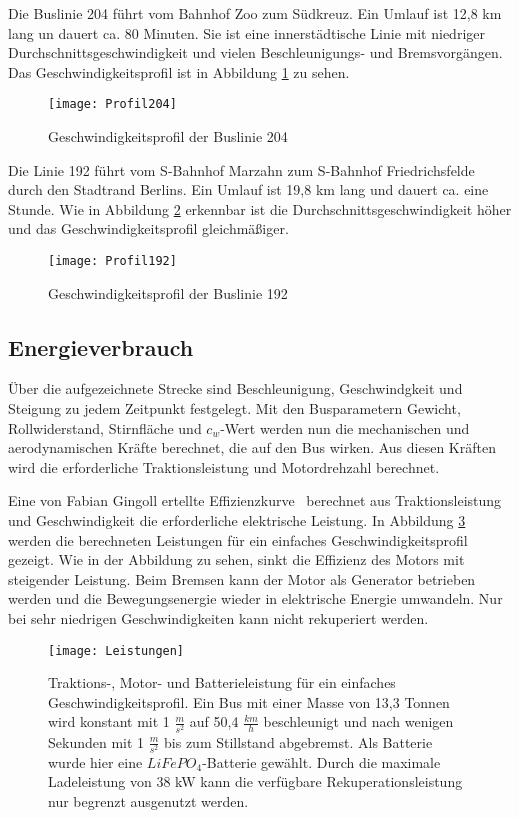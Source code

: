 Die Buslinie 204 führt vom Bahnhof Zoo zum Südkreuz. Ein Umlauf ist 12,8 km lang un dauert ca. 80 Minuten. Sie ist eine innerstädtische Linie mit niedriger Durchschnittsgeschwindigkeit und vielen Beschleunigungs- und Bremsvorgängen. Das Geschwindigkeitsprofil ist in Abbildung \ref{Abb_204} zu sehen.
\begin{figure}\centering
	\texttt{[image: Profil204]}
	\caption{Geschwindigkeitsprofil der Buslinie 204}
	\label{Abb_204}
\end{figure}

Die Linie 192 führt vom S-Bahnhof Marzahn zum S-Bahnhof Friedrichsfelde durch den Stadtrand Berlins. Ein Umlauf ist 19,8 km lang und dauert ca. eine Stunde. Wie in Abbildung \ref{Abb_192} erkennbar ist die Durchschnittsgeschwindigkeit höher und das Geschwindigkeitsprofil gleichmäßiger.

\begin{figure}\centering
	\texttt{[image: Profil192]}
	\caption{Geschwindigkeitsprofil der Buslinie 192}
	\label{Abb_192}
\end{figure}

\subsection{Energieverbrauch}
Über die aufgezeichnete Strecke sind Beschleunigung, Geschwindgkeit und Steigung zu jedem Zeitpunkt festgelegt. Mit den Busparametern Gewicht, Rollwiderstand, Stirnfläche und $c_w$-Wert werden nun die mechanischen und aerodynamischen Kräfte berechnet, die auf den Bus wirken. Aus diesen Kräften wird die erforderliche Traktionsleistung und Motordrehzahl berechnet.

Eine von Fabian Gingoll ertellte Effizienzkurve~\cite{MotorEntwurf} berechnet aus Traktionsleistung und Geschwindigkeit die erforderliche elektrische Leistung. In Abbildung \ref{abb_Leistungen} werden die berechneten Leistungen für ein einfaches Geschwindigkeitsprofil gezeigt. Wie in der Abbildung zu sehen, sinkt die Effizienz des Motors mit steigender Leistung. Beim Bremsen kann der Motor als Generator betrieben werden und die Bewegungsenergie wieder in elektrische Energie umwandeln. Nur bei sehr niedrigen Geschwindigkeiten kann nicht rekuperiert werden.
\begin{figure}\centering
	\texttt{[image: Leistungen]}
	\caption[Traktions-, Motor- und Batterieleistung]{Traktions-, Motor- und Batterieleistung für ein einfaches Geschwindigkeitsprofil. Ein Bus mit einer Masse von 13,3 Tonnen wird konstant mit 1 $\frac{m}{s^2}$ auf 50,4 $\frac{km}{h}$ beschleunigt und nach wenigen Sekunden mit 1 $\frac{m}{s^2}$ bis zum Stillstand abgebremst. Als Batterie wurde hier eine $LiFePO_4$-Batterie gewählt. Durch die maximale Ladeleistung von 38 kW kann die verfügbare Rekuperationsleistung nur begrenzt ausgenutzt werden.}
	\label{abb_Leistungen}
\end{figure}

